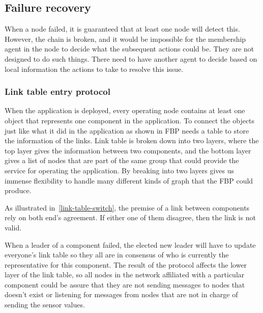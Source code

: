 \subsection{Failure recovery}


When a node failed, it is guaranteed that at least one node will detect
this. However, the chain is broken, and it would be impossible for the
membership agent in the node to decide what the subsequent actions could be.
They are not designed to do such things.
There need to have another agent to decide based on local information the
actions to take to resolve this issue.

\subsubsection{Link table entry protocol}


When the application is deployed, every operating node contains at least one
object that represents one component in the application. To connect the objects
just like what it did in the application as shown in FBP needs a table to store
the information of the links. Link table is broken down into two layers, where
the top layer gives the information between two components, and the bottom
layer gives a list of nodes that are part of the same group that could provide
the service for operating the application. By breaking into two layers gives
us immense flexibility to handle many different kinds of graph that the FBP could
produce.


As illustrated in~\ref{link-table-switch}, the premise of a link between
components rely on both end's agreement. If either one of them disagree, then
the link is not valid.

When a leader of a component failed, the elected new leader will have to update
everyone’s
link table so they all are in consensus of who is currently the representative
for this component. The result of the protocol affects the lower layer of the
link table, so all nodes in the network affiliated with a particular component
could be assure that they are not sending messages to nodes that doesn't exist 
or listening for messages from nodes that are not in charge of sending the
sensor values.

